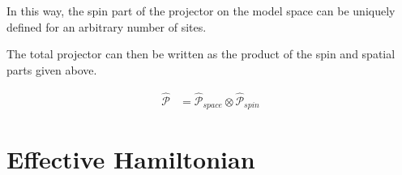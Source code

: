 \documentclass[12pt,twoside]{report}
\begin{document}
	In this way, the spin part of the projector on the model space can be uniquely
	defined for an arbitrary number of sites.

	The total projector can then be written as the product of the spin
	and spatial parts given above.

	\begin{equation}
		\begin{split}
			\hat{\mathcal{P}} & = \hat{\mathcal{P}}_{space}\otimes\hat{\mathcal{P}}_{spin}
		\end{split}
		\label{eq:demodel}
	\end{equation}
	
	\section{Effective Hamiltonian}
	
	
\end{document}
